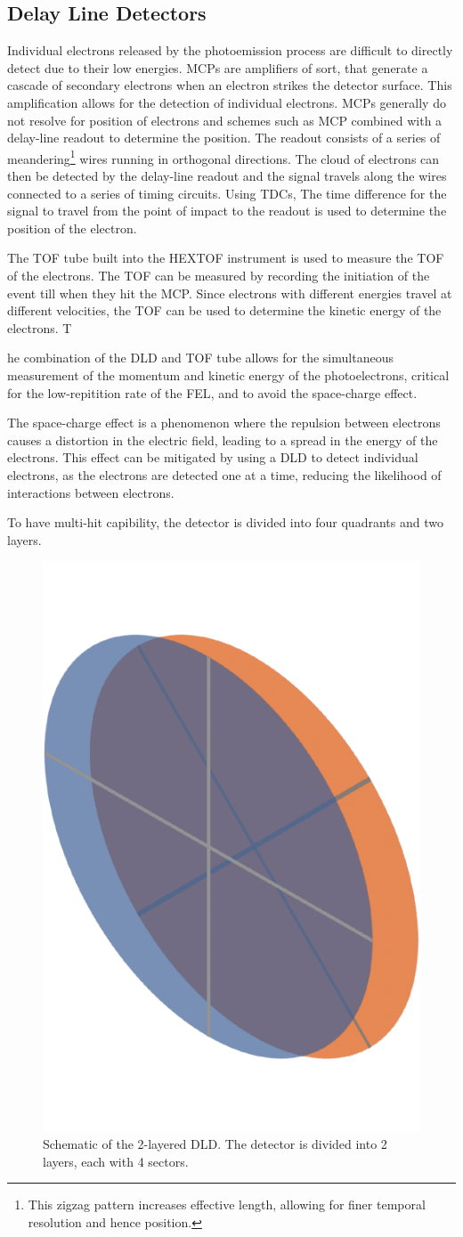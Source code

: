 \subsection{Delay Line Detectors}
Individual electrons released by the photoemission process are difficult to directly detect due to their low energies. \Glspl{MCP} are amplifiers of sort, that generate a cascade of secondary electrons when an electron strikes the detector surface. This amplification allows for the detection of individual electrons. \Glspl{MCP} generally do not resolve for position of electrons and schemes such as \gls{MCP} combined with a delay-line readout to determine the position. The readout consists of a series of meandering\footnote{This zigzag pattern increases effective length, allowing for finer temporal resolution and hence position.} wires running in orthogonal directions. The cloud of electrons can then be detected by the delay-line readout and the signal travels along the wires connected to a series of timing circuits. Using \glspl{TDC}, The time difference for the signal to travel from the point of impact to the readout is used to determine the position of the electron.

The \gls{TOF} tube built into the \gls{HEXTOF} instrument is used to measure the \gls{TOF} of the electrons. The \gls{TOF} can be measured by recording the initiation of the event till when they hit the \gls{MCP}. Since electrons with different energies travel at different velocities, the \gls{TOF} can be used to determine the kinetic energy of the electrons. T

he combination of the \gls{DLD} and \gls{TOF} tube allows for the simultaneous measurement of the momentum and kinetic energy of the photoelectrons, critical for the low-repitition rate of the \gls{FEL}, and to avoid the space-charge effect.

The space-charge effect is a phenomenon where the repulsion between electrons causes a distortion in the electric field, leading to a spread in the energy of the electrons. This effect can be mitigated by using a \gls{DLD} to detect individual electrons, as the electrons are detected one at a time, reducing the likelihood of interactions between electrons.

To have multi-hit capibility, the detector is divided into four quadrants and two layers.


\begin{figure}
    \centering
    \includegraphics[width=0.3\linewidth]{images/sectors_figure.pdf}
    \caption{Schematic of the 2-layered DLD. The detector is divided into 2 layers, each with 4 sectors.}
    \label{fig:sectors}
\end{figure}

